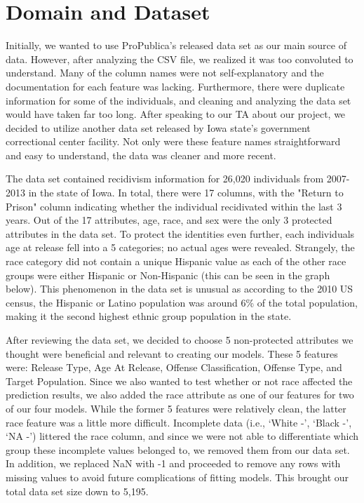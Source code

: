 \documentclass[11pt, sigconf]{acmart}
\begin{document}
\section{Domain and Dataset}

\hspace{5mm}Initially, we wanted to use ProPublica's released data set as our main source of data. However, after analyzing the CSV file, we realized it was too convoluted to understand. Many of the column names were not self-explanatory and the documentation for each feature was lacking. Furthermore, there were duplicate information for some of the individuals, and cleaning and analyzing the data set would have taken far too long. After speaking to our TA about our project, we decided to utilize another data set released by Iowa state's government correctional center facility. Not only were these feature names straightforward and easy to understand, the data was cleaner and more recent. 

The data set contained recidivism information for 26,020 individuals from 2007-2013 in the state of Iowa. In total, there were 17 columns, with the "Return to Prison" column indicating whether the individual recidivated within the last 3 years. Out of the 17 attributes, age, race, and sex were the only 3 protected attributes in the data set. To protect the identities even further, each individuals age at release fell into a 5 categories; no actual ages were revealed. Strangely, the race category did not contain a unique Hispanic value as each of the other race groups were either Hispanic or Non-Hispanic (this can be seen in the graph below). This phenomenon in the data set is unusual as according to the 2010 US census, the Hispanic or Latino population was around 6\% of the total population, making it the second highest ethnic group population in the state.\cite{2}

After reviewing the data set, we decided to choose 5 non-protected attributes we thought were beneficial and relevant to creating our models. These 5 features were: Release Type, Age At Release, Offense Classification, Offense Type, and Target Population. Since we also wanted to test whether or not race affected the prediction results, we also added the race attribute as one of our features for two of our four models. While the former 5 features were relatively clean, the latter race feature was a little more difficult. Incomplete data (i.e., ‘White -’, ‘Black -’, ‘NA -’) littered the race column, and since we were not able to differentiate which group these incomplete values belonged to, we removed them from our data set. In addition, we replaced NaN with -1 and proceeded to remove any rows with missing values to avoid future complications of fitting models. This brought our total data set size down to 5,195.
\end{document}
